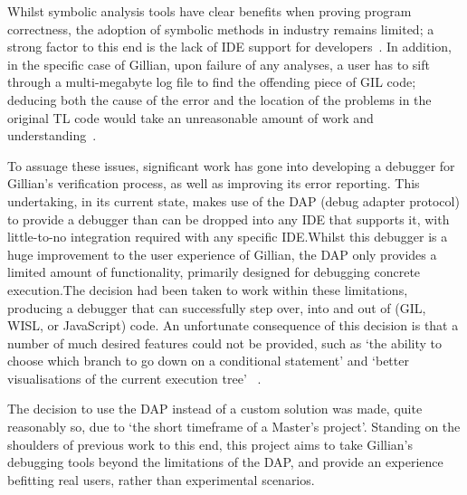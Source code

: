 Whilst symbolic analysis tools have clear benefits when proving program
correctness, the adoption of symbolic methods in industry remains limited; a
strong factor to this end is the lack of IDE support for
developers~\cite{magpiebridge}.
In addition, in the specific case of Gillian, upon failure of any analyses, a
user has to sift through a multi-megabyte log file to find the offending piece
of GIL code; deducing both the cause of the error and the location of the
problems in the original TL code would take an unreasonable amount of work and
understanding~\cite{gillian-debugging-2021}.

To assuage these issues, significant work has gone into developing a debugger
for Gillian's verification process, as well as improving its error reporting.
This undertaking, in its current state, makes use of the DAP (debug adapter
protocol) to provide a debugger than can be dropped into any IDE that supports
it, with little-to-no integration required with any specific IDE.\@ Whilst this
debugger is a huge improvement to the user experience of Gillian, the DAP only
provides a limited amount of functionality, primarily designed for debugging
concrete execution.\@ The decision had been taken to work within these
limitations, producing a debugger that can successfully step over, into and out
of (GIL, WISL, or JavaScript) code. An unfortunate consequence of this decision
is that a number of much desired features could not be provided, such as `the
ability to choose which branch to go down on a conditional statement' and
`better visualisations of the current execution tree'
~\cite[p.~49]{gillian-debugging-2021}.

The decision to use the DAP instead of a custom solution was made, quite
reasonably so, due to `the short timeframe of a Master's project'. Standing on
the shoulders of previous work to this end, this project aims to take Gillian's
debugging tools beyond the limitations of the DAP, and provide an experience
befitting real users, rather than experimental scenarios. 
